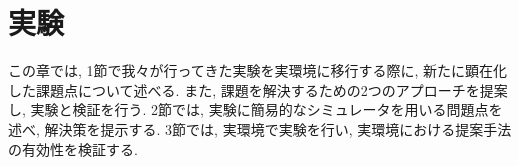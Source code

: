 \chapter{実験}
\label{chap:experiments}
この章では, 1節で我々が行ってきた実験\cite{mech}を実環境に移行する際に, 新たに顕在化した課題点について述べる. また, 課題を解決するための2つのアプローチを提案し, 実験と検証を行う. 2節では, 実験に簡易的なシミュレータを用いる問題点を述べ, 解決策を提示する. 3節では, 実環境で実験を行い, 実環境における提案手法の有効性を検証する.  
%
%
%

%
